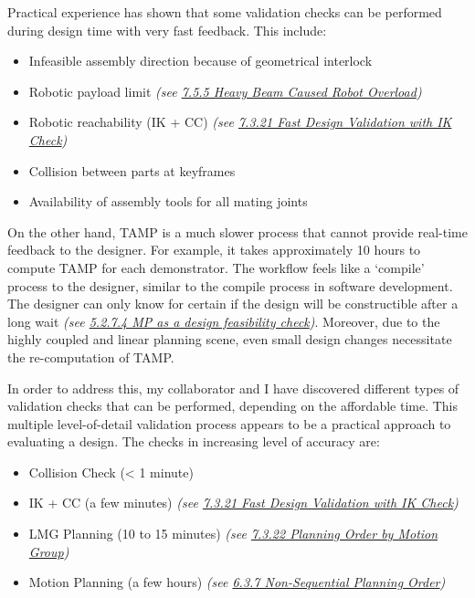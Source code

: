 Practical experience has shown that some validation checks can be performed during design time with very fast feedback. This include: 

\begin{itemize}
	\item Infeasible assembly direction because of geometrical interlock

	\item Robotic payload limit \textit{(see \ul{7.5.5 Heavy Beam Caused Robot Overload})}

	\item Robotic reachability (IK + CC) \textit{(see \ul{7.3.21 Fast Design Validation with IK Check})}

	\item Collision between parts at keyframes

	\item Availability of assembly tools for all mating joints

\end{itemize}
On the other hand, TAMP is a much slower process that cannot provide real-time feedback to the designer. For example, it takes approximately 10 hours to compute TAMP for each demonstrator. The workflow feels like a ‘compile’ process to the designer, similar to the compile process in software development. The designer can only know for certain if the design will be constructible after a long wait \textit{(see \ul{5.2.7.4 MP as a design feasibility check})}. Moreover, due to the highly coupled and linear planning scene, even small design changes necessitate the re-computation of TAMP.

In order to address this, my collaborator and I have discovered different types of validation checks that can be performed, depending on the affordable time. This multiple level-of-detail validation process appears to be a practical approach to evaluating a design. The checks in increasing level of accuracy are:

\begin{itemize}
	\item Collision Check (< 1 minute)

	\item IK + CC (a few minutes) \textit{(see \ul{7.3.21 Fast Design Validation with IK Check})}

	\item LMG Planning (10 to 15 minutes) \textit{(see \ul{7.3.22 Planning Order by Motion Group})}

	\item Motion Planning (a few hours) \textit{(see \ul{6.3.7 Non-Sequential Planning Order})}

\end{itemize}
